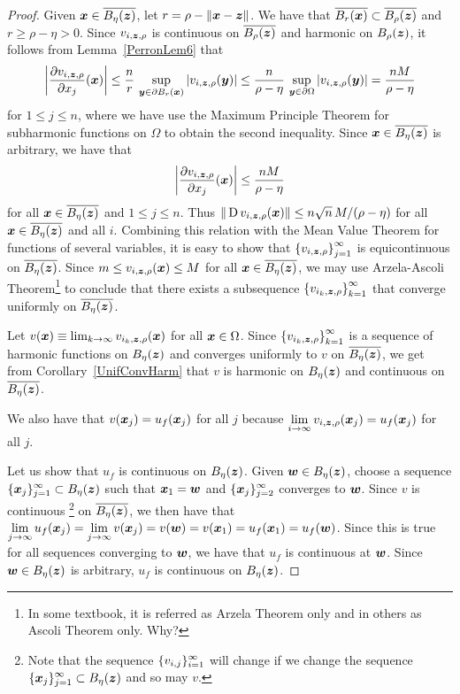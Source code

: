 \begin{proof}
 Given ${\bm{x}} \in \overline{B_\eta({\bm{z}})}$, let 
$r = \rho - \|{\bm{x}}-{\bm{z}}\|$.  We have that
$\displaystyle \overline{B_r({\bm{x}})} \subset \overline{B_\rho({\bm{z}})}$ and
$r\geq \rho-\eta>0$.  Since $v_{i,{\bm{z}},\rho}$ is continuous on
$\overline{B_\rho({\bm{z}})}$ and harmonic on $B_\rho({\bm{z}})$, it
follows from Lemma~\ref{PerronLem6} that
\[
\left|\frac{\partial{v_{i,{\bm{z}},\rho}}}{\partial x_j}({\bm{x}})\right|
\leq \frac{n}{r}\, \sup_{{\bm{y}} \in \partial B_r({\bm{x}})}
|v_{i,{\bm{z}},\rho}({\bm{y}})|
\leq \frac{n}{\rho-\eta}\, \sup_{{\bm{y}} \in \partial \Omega}
|v_{i,{\bm{z}},\rho}({\bm{y}})| = \frac{nM}{\rho-\eta}
\]
for $1 \leq j \leq n$, where we have use the Maximum Principle Theorem
for subharmonic functions on $\Omega$ to obtain the second inequality.
Since ${\bm{x}} \in \overline{B_\eta({\bm{z}})}$ is arbitrary,
we have that
\[
\left|\frac{\partial{v_{i,{\bm{z}},\rho}}}{\partial x_j}({\bm{x}})\right|
\leq \frac{nM}{\rho-\eta}
\]
for all ${\bm{x}} \in \overline{B_\eta({\bm{z}})}$ and
$1 \leq j \leq n$.  Thus
$\|\operatorname{D} v_{i,{\bm{z}},\rho} ({\bm{x}})\| \leq n\sqrt{n}\,M/(\rho-\eta)$ for all
${\bm{x}} \in \overline{B_\eta({\bm{z}})}$ and all $i$.  Combining this
relation with the Mean Value Theorem for functions of several
variables, it is easy to show that
$\displaystyle \left\{ v_{i,{\bm{z}},\rho} \right\}_{j=1}^\infty$ is
equicontinuous on $\overline{B_\eta({\bm{z}})}$.  Since
$m \leq v_{i,{\bm{z}},\rho} ({\bm{x}}) \leq M$ for all
${\bm{x}} \in \overline{B_\eta({\bm{z}})}$, we may use Arzela-Ascoli
Theorem\footnote{In some textbook, it is referred as
Arzela Theorem only and in others as Ascoli Theorem only.  Why?}
to conclude that there exists a subsequence 
$\displaystyle \left\{ v_{i_k,{\bm{z}},\rho} \right\}_{k=1}^\infty$
that converge uniformly on 
$\overline{B_\eta({\bm{z}})}$.

Let $v({\bm{x}}) \equiv \lim_{k\to \infty} v_{i_k,{\bm{z}},\rho}({\bm{x}})$
for all ${\bm{x}} \in \Omega$.  Since
$\displaystyle \left\{v_{i_k,{\bm{z}},\rho}\right\}_{k=1}^\infty$ is a
sequence of harmonic functions on $B_\eta({\bm{z}})$ and converges
uniformly to $v$ on $\overline{B_\eta({\bm{z}})}$, we get from
Corollary~\ref{UnifConvHarm} that $v$ is harmonic on $B_\eta({\bm{z}})$
and continuous on $\overline{B_\eta({\bm{z}})}$.

We also have that $v({\bm{x}}_j) = u_f({\bm{x}}_j)$ for all $j$ because
$\displaystyle \lim_{i \to \infty} v_{i,{\bm{z}},\rho}({\bm{x}}_j)
= u_f({\bm{x}}_j)$ for all $j$.

 Let us show that $u_f$ is continuous on $B_\eta({\bm{z}})$.
Given ${\bm{w}} \in B_\eta({\bm{z}})$, choose a sequence
$\displaystyle \{{\bm{x}}_j\}_{j=1}^\infty \subset B_\eta({\bm{z}})$
such that ${\bm{x}}_1 = {\bm{w}}$ and $\displaystyle \{{\bm{x}}_j\}_{j=2}^\infty$
converges to ${\bm{w}}$.  Since $v$ is continuous \footnote{Note that
the sequence $\displaystyle \{v_{i,j}\}_{i=1}^\infty$ will change if
we change the sequence
$\displaystyle \{{\bm{x}}_j\}_{j=1}^\infty \subset B_\eta({\bm{z}})$ and
so may $v$.} on $\overline{B_\eta({\bm{z}})}$, we then have that
$\displaystyle \lim_{j\to \infty} u_f({\bm{x}}_j)
= \lim_{j\to \infty} v({\bm{x}}_j) = v({\bm{w}}) = v({\bm{x}}_1) = 
u_f({\bm{x}}_1) = u_f({\bm{w}})$.
Since this is true for all sequences converging to ${\bm{w}}$, we have
that $u_f$ is continuous at ${\bm{w}}$.  Since ${\bm{w}} \in B_\eta({\bm{z}})$
is arbitrary, $u_f$ is continuous on $B_\eta({\bm{z}})$.


\end{proof}
